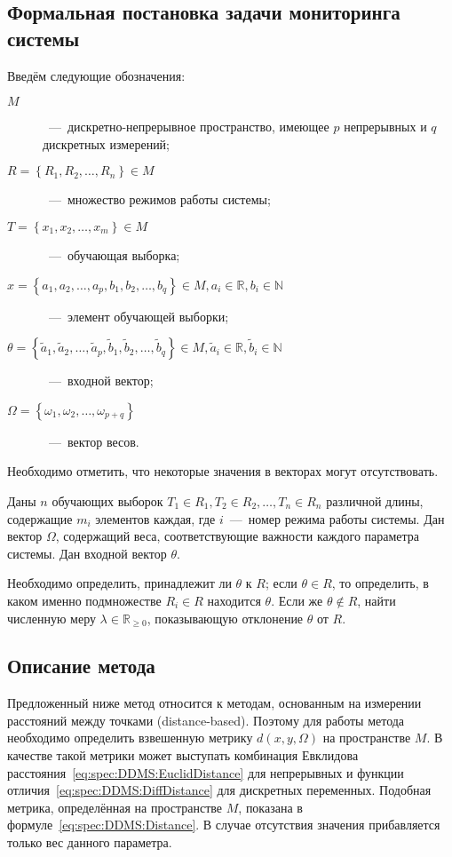 ﻿\subsection{Формальная постановка задачи мониторинга системы}
\label{subsec:spec:DDMS:FormalTask}
Введём следующие обозначения:
\begin{description}
	\item[$M$]~---~дискретно-непрерывное пространство, имеющее $p$ непрерывных и $q$ дискретных измерений;
	\item[$R=\left\{R_1,R_2,\dots,R_n\right\} \in M$]~---~множество режимов работы системы;
	\item[$T=\left\{x_1,x_2,\dots,x_m\right\} \in M$]~---~обучающая выборка;
	\item[$x=\left\{a_1,a_2,\dots,a_p,b_1,b_2,\dots,b_q\right\} \in M, a_i\in\mathbb{R}, b_i\in\mathbb{N}$]~---~элемент обучающей выборки;
	\item[$\theta=\left\{\tilde{a}_1,\tilde{a}_2,\dots,\tilde{a}_p,\tilde{b}_1,\tilde{b}_2,\dots,\tilde{b}_q\right\} \in M, \tilde{a}_i\in\mathbb{R}, \tilde{b}_i\in\mathbb{N}$]~---~входной вектор;
	\item[$\Omega=\left\{\omega_1,\omega_2,\dots,\omega_{p+q}\right\}$]~---~вектор весов.
\end{description}

Необходимо отметить, что некоторые значения в векторах могут отсутствовать.

Даны $n$ обучающих выборок $T_1\in R_1, T_2\in R_2,\dots, T_n\in R_n$ различной длины, содержащие $m_i$ элементов каждая, где $i$~---~номер режима работы системы. Дан вектор $\Omega$, содержащий веса, соответствующие важности каждого параметра системы. Дан входной вектор $\theta$.

Необходимо определить, принадлежит ли $\theta$ к $R$; если $\theta \in R$, то определить, в каком именно подмножестве $R_i\in R$ находится $\theta$. Если же $\theta \notin R$, найти численную меру $\lambda \in \mathbb{R}_{\geq 0}$, показывающую отклонение $\theta$ от $R$.

\subsection{Описание метода}
Предложенный ниже метод относится к методам, основанным на измерении расстояний между точками (distance-based). Поэтому для работы метода необходимо определить взвешенную метрику $d(x,y,\Omega)$ на пространстве $M$. В качестве такой метрики может выступать комбинация Евклидова расстояния~\eqref{eq:spec:DDMS:EuclidDistance} для непрерывных и функции отличия~\eqref{eq:spec:DDMS:DiffDistance} для дискретных переменных. Подобная метрика, определённая на пространстве $M$, показана в формуле~\eqref{eq:spec:DDMS:Distance}. В случае отсутствия значения прибавляется только вес данного параметра.

